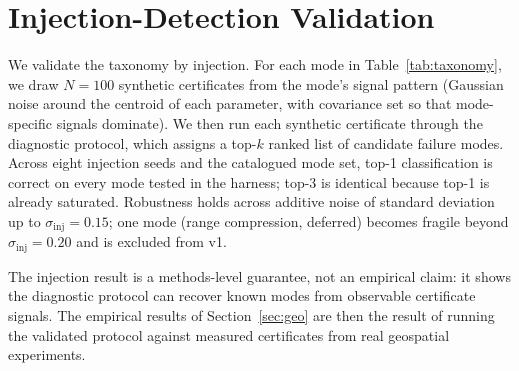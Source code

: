 \section{Injection-Detection Validation}
\label{sec:injection}

We validate the taxonomy by injection. For each mode in Table~\ref{tab:taxonomy}, we draw $N{=}100$ synthetic certificates from the mode's signal pattern (Gaussian noise around the centroid of each parameter, with covariance set so that mode-specific signals dominate). We then run each synthetic certificate through the diagnostic protocol, which assigns a top-$k$ ranked list of candidate failure modes. Across eight injection seeds and the catalogued mode set, top-1 classification is correct on every mode tested in the harness; top-3 is identical because top-1 is already saturated. Robustness holds across additive noise of standard deviation up to $\sigma_{\text{inj}}{=}0.15$; one mode (range compression, deferred) becomes fragile beyond $\sigma_{\text{inj}}{=}0.20$ and is excluded from v1.

The injection result is a methods-level guarantee, not an empirical claim: it shows the diagnostic protocol can recover known modes from observable certificate signals. The empirical results of Section~\ref{sec:geo} are then the result of running the validated protocol against measured certificates from real geospatial experiments.
